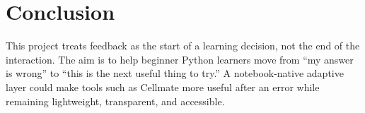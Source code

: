 \documentclass[project-plan]{report-template}
\begin{document}
\section{Conclusion}

This project treats feedback as the start of a learning decision, not the end of the interaction. The aim is to help beginner Python learners move from ``my answer is wrong'' to ``this is the next useful thing to try.'' A notebook-native adaptive layer could make tools such as Cellmate more useful after an error while remaining lightweight, transparent, and accessible.



\end{document}

